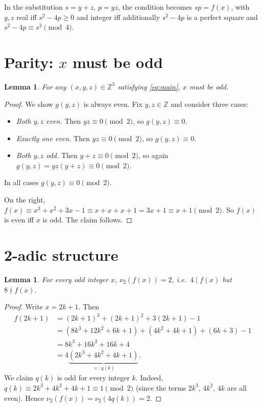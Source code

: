 \documentclass[12pt, a4paper]{article}
\newtheorem{lemma}[theorem]{Lemma}
\theoremstyle{definition}
\newcommand{\Z}{\mathbb{Z}}
\begin{document}
In the substitution $s = y+z$, $p = yz$, the condition becomes $sp = f(x)$,
with $y,z$ real iff $s^2-4p\ge0$ and integer iff additionally $s^2-4p$ is
a perfect square and $s^2-4p\equiv s^2\pmod{4}$.

\section{Parity: \texorpdfstring{$x$}{x} must be odd}
\label{sec:parity}

\begin{lemma}\label{lem:parity}
  For any $(x,y,z)\in\Z^3$ satisfying \eqref{eq:main}, $x$ must be odd.
\end{lemma}

\begin{proof}
We show $g(y,z)$ is always even. Fix $y,z\in\Z$ and consider three cases:
\begin{itemize}
  \item \emph{Both $y,z$ even.} Then $yz\equiv 0\pmod{2}$, so $g(y,z)\equiv0$.
  \item \emph{Exactly one even.} Then $yz\equiv0\pmod{2}$, so $g(y,z)\equiv0$.
  \item \emph{Both $y,z$ odd.} Then $y+z\equiv0\pmod{2}$, so again
        $g(y,z)=yz(y+z)\equiv0\pmod{2}$.
\end{itemize}
In all cases $g(y,z)\equiv 0\pmod{2}$.

On the right, $f(x)\equiv x^3+x^2+3x-1\equiv x+x+x+1=3x+1\equiv x+1\pmod{2}$.
So $f(x)$ is even iff $x$ is odd. The claim follows.
\end{proof}

\section{2-adic structure}
\label{sec:twadic}

\begin{lemma}\label{lem:twadic}
  For every odd integer $x$, $\nu_2(f(x))=2$, i.e.\ $4\mid f(x)$ but
  $8\nmid f(x)$.
\end{lemma}

\begin{proof}
Write $x = 2k+1$.  Then
\begin{align*}
  f(2k+1) &= (2k+1)^3 + (2k+1)^2 + 3(2k+1) - 1 \\
  &= (8k^3 + 12k^2 + 6k + 1) + (4k^2 + 4k + 1)
     + (6k + 3) - 1 \\
  &= 8k^3 + 16k^2 + 16k + 4 \\
  &= 4\underbrace{(2k^3 + 4k^2 + 4k + 1)}_{=: q(k)}.
\end{align*}
We claim $q(k)$ is odd for every integer $k$.  Indeed,
$q(k)\equiv 2k^3+4k^2+4k+1\equiv 1\pmod{2}$ (since the terms $2k^3$,
$4k^2$, $4k$ are all even).  Hence $\nu_2(f(x))=\nu_2(4q(k))=2$.
\end{proof}
\end{document}
